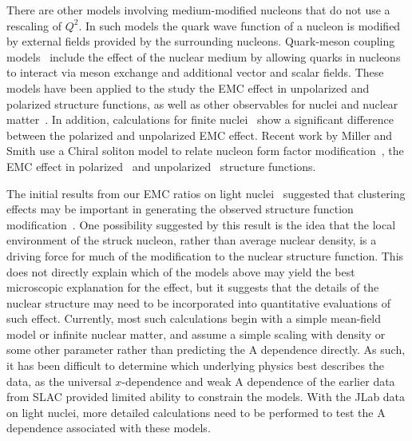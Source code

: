 There are other models involving medium-modified nucleons that do not use
a rescaling of $Q^2$.  In such models the quark wave function of a nucleon is
modified by external fields provided by the surrounding nucleons. Quark-meson
coupling models~\cite{Saito:1994ki} include the effect of the nuclear medium
by allowing quarks in nucleons to interact via meson exchange and additional
vector and scalar fields. These models have been applied to the study the EMC
effect in unpolarized and polarized \cite{Cloet:2005rt, Cloet:2006bq}
structure functions, as well as other observables for nuclei and nuclear
matter~\cite{Saito:2005rv}. In addition, calculations for finite
nuclei~\cite{Cloet:2006bq} show a significant difference between the polarized
and unpolarized EMC effect. Recent work by Miller and Smith use a Chiral
soliton model to relate nucleon form factor modification~\cite{Smith:2004dn},
the EMC effect in polarized~\cite{Smith:2005ra} and
unpolarized~\cite{Smith:2002ci} structure functions.



The initial results from our EMC ratios on light nuclei~\cite{seely09}
suggested that clustering effects may be important in generating the observed
structure function modification~\cite{Hirai_clusteringSF2010}.  One possibility
suggested by this result is the idea that the local environment of the struck
nucleon, rather than average nuclear density, is a driving force for much of
the modification to the nuclear structure function.  This does not directly
explain which of the models above may yield the best microscopic explanation
for the effect, but it suggests that the details of the nuclear structure
may need to be incorporated into quantitative evaluations of such effect.
Currently, most such calculations begin with a simple mean-field model or
infinite nuclear matter, and assume a simple scaling with density or some
other parameter rather than predicting the A dependence directly.  As such,
it has been difficult to determine which underlying physics best describes
the data, as the universal $x$-dependence and weak A dependence of the
earlier data from SLAC provided limited ability to constrain the models.
With the JLab data on light nuclei, more detailed calculations need to be
performed to test the A dependence associated with these models.



